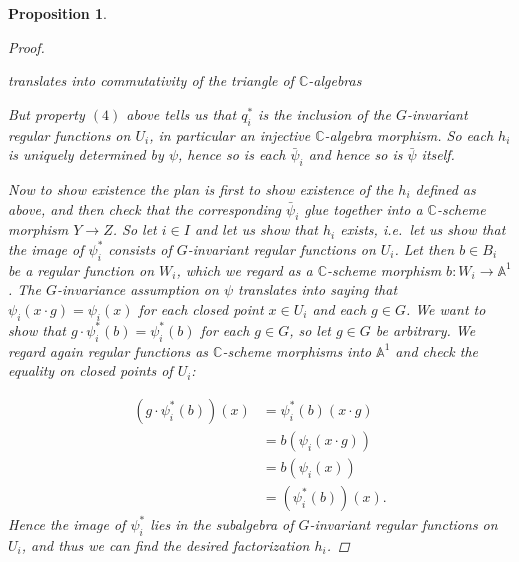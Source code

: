 \documentclass[12pt,a4paper]{amsart}
\theoremstyle{plain}
\newtheorem{prop}[thm]{Proposition}
\theoremstyle{definition}
\theoremstyle{remark}
\begin{document}
\begin{prop}
\begin{proof}
    \begin{center}
    \end{center}
    translates into commutativity of the triangle of $\mathbb{C}$-algebras

    \begin{center}
    \end{center}

    But property $(4)$ above tells us that $q_{i}^{*}$ is the inclusion of the $G$-invariant regular functions on $U_{i}$, in particular an injective $\mathbb{C}$-algebra morphism.
    So each $h_{i}$ is uniquely determined by $\psi$, hence so is each $\bar{\psi}_{i}$ and hence so is $\bar{\psi}$ itself.

    Now to show existence the plan is first to show existence of the $h_{i}$ defined as above, and then check that the corresponding $\bar{\psi}_{i}$ glue together into a $\mathbb{C}$-scheme morphism $Y \to Z$.
    So let $i \in I$ and let us show that $h_{i}$ exists, i.e.~let us show that the image of $\psi_{i}^{*}$ consists of $G$-invariant regular functions on $U_{i}$.
    Let then $b \in B_{i}$ be a regular function on $W_{i}$, which we regard as a $\mathbb{C}$-scheme morphism $b \colon W_{i} \to \mathbb{A}^{1}$.
    The $G$-invariance assumption on $\psi$ translates into saying that $\psi_{i}(x \cdot g) = \psi_{i}(x)$ for each closed point $x \in U_{i}$ and each $g \in G$.
    We want to show that $g \cdot \psi_{i}^{*}(b) = \psi_{i}^{*}(b)$ for each $g \in G$, so let $g \in G$ be arbitrary.
    We regard again regular functions as $\mathbb{C}$-scheme morphisms into $\mathbb{A}^{1}$ and check the equality on closed points of $U_{i}$:

    \begin{align*}
      (g \cdot \psi_{i}^{*}(b))(x) & = \psi_{i}^{*}(b)(x \cdot g) \\
      & = b(\psi_{i}(x \cdot g)) \\
      & = b(\psi_{i}(x)) \\
      & = (\psi_{i}^{*}(b))(x).
    \end{align*}
    Hence the image of $\psi_{i}^{*}$ lies in the subalgebra of $G$-invariant regular functions on $U_{i}$, and thus we can find the desired factorization $h_{i}$.


\end{proof}
\end{prop}
\end{document}
